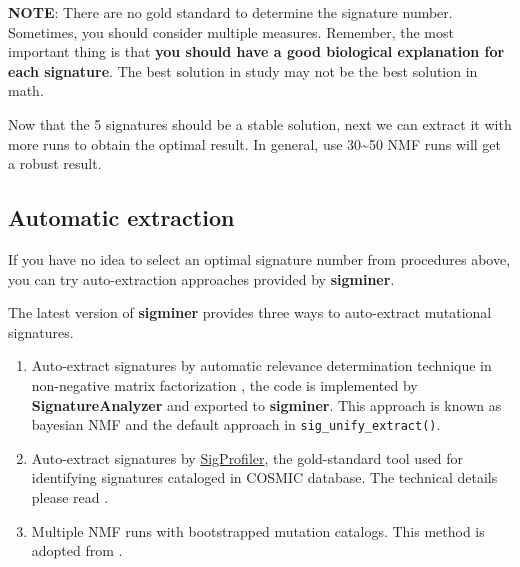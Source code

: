 \documentclass[
  12pt,
  a4paper,
  twoside]{book}
\newenvironment{Shaded}{\begin{snugshade}}{\end{snugshade}}
\newcommand{\AttributeTok}[1]{\textcolor[rgb]{0.77,0.63,0.00}{#1}}
\newcommand{\DecValTok}[1]{\textcolor[rgb]{0.00,0.00,0.81}{#1}}
\newcommand{\FunctionTok}[1]{\textcolor[rgb]{0.00,0.00,0.00}{#1}}
\newcommand{\NormalTok}[1]{#1}
\newcommand{\OtherTok}[1]{\textcolor[rgb]{0.56,0.35,0.01}{#1}}
\newcommand{\SpecialCharTok}[1]{\textcolor[rgb]{0.00,0.00,0.00}{#1}}
\providecommand{\tightlist}{%
  \setlength{\itemsep}{0pt}\setlength{\parskip}{0pt}}
\begin{document}
\textbf{NOTE}: There are no gold standard to determine the signature number. Sometimes, you should consider multiple measures. Remember, the most important thing is that \textbf{you should have a good biological explanation for each signature}.
The best solution in study may not be the best solution in math.

Now that the 5 signatures should be a stable solution, next we can extract it with
more runs to obtain the optimal result. In general, use 30\textasciitilde50 NMF runs will get a robust result.

\begin{Shaded}
\end{Shaded}

\hypertarget{automatic-extraction}{%
\subsection{Automatic extraction}\label{automatic-extraction}}

If you have no idea to select an optimal signature number from procedures above, you can try auto-extraction approaches provided by \textbf{sigminer}.

The latest version of \textbf{sigminer} provides three ways to auto-extract mutational signatures.

\begin{enumerate}
\def\labelenumi{\arabic{enumi}.}
\tightlist
\item
  Auto-extract signatures by automatic relevance determination technique in non-negative matrix factorization \citep{tan2012automatic}, the code is implemented by \textbf{SignatureAnalyzer} \citep{kim2016somatic} and exported to \textbf{sigminer}. This approach is known as bayesian NMF and the default approach in \texttt{sig\_unify\_extract()}.
\item
  Auto-extract signatures by \href{https://github.com/AlexandrovLab/SigProfilerExtractor}{SigProfiler}, the gold-standard tool used for identifying signatures cataloged in COSMIC database. The technical details please read \citet{alexandrov2020repertoire}.
\item
  Multiple NMF runs with bootstrapped mutation catalogs. This method is adopted from \citet{degasperi2020practical}.
\end{enumerate}
\end{document}
